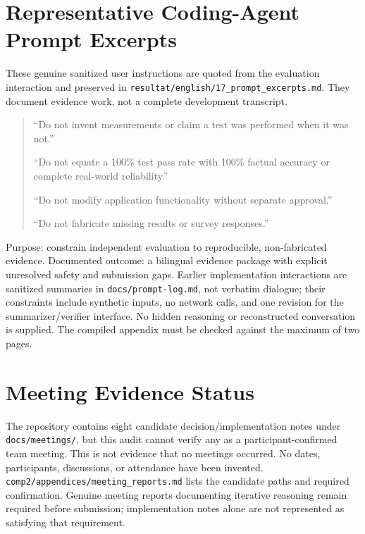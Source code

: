 \documentclass{article}
\begin{document}
\section{Representative Coding-Agent Prompt Excerpts}
\label{promptstart}
These genuine sanitized user instructions are quoted from the evaluation interaction and preserved in \texttt{resultat/english/17\_prompt\_excerpts.md}. They document evidence work, not a complete development transcript.
\begin{quote}
``Do not invent measurements or claim a test was performed when it was not.''

``Do not equate a 100\% test pass rate with 100\% factual accuracy or complete real-world reliability.''

``Do not modify application functionality without separate approval.''

``Do not fabricate missing results or survey responses.''
\end{quote}
Purpose: constrain independent evaluation to reproducible, non-fabricated evidence. Documented outcome: a bilingual evidence package with explicit unresolved safety and submission gaps. Earlier implementation interactions are sanitized summaries in \texttt{docs/prompt-log.md}, not verbatim dialogue; their constraints include synthetic inputs, no network calls, and one revision for the summarizer/verifier interface. No hidden reasoning or reconstructed conversation is supplied. The compiled appendix must be checked against the maximum of two pages.
\label{promptend}
\clearpage
\section{Meeting Evidence Status}
The repository contains eight candidate decision/implementation notes under \texttt{docs/meetings/}, but this audit cannot verify any as a participant-confirmed team meeting. This is not evidence that no meetings occurred. No dates, participants, discussions, or attendance have been invented. \texttt{comp2/appendices/meeting\_reports.md} lists the candidate paths and required confirmation. Genuine meeting reports documenting iterative reasoning remain required before submission; implementation notes alone are not represented as satisfying that requirement.
\end{document}
